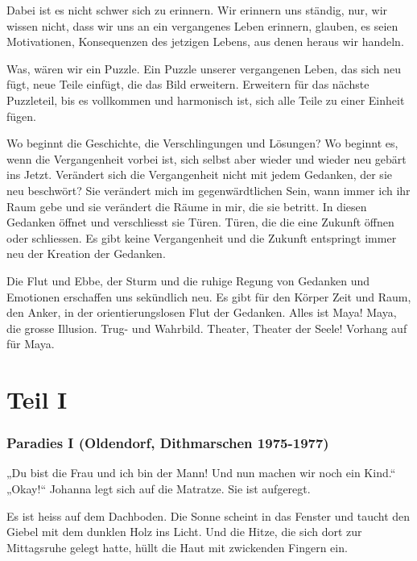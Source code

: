 \documentclass[10pt,a5paper]{book}
\begin{document}
Dabei ist es nicht schwer sich zu erinnern. Wir erinnern uns ständig, nur, wir wissen nicht, dass wir uns an ein vergangenes Leben erinnern, glauben, es seien Motivationen, Konsequenzen des jetzigen Lebens, aus denen heraus wir handeln.

Was, wären wir ein Puzzle. Ein Puzzle unserer vergangenen Leben, das sich neu fügt, neue Teile einfügt, die das Bild erweitern. Erweitern für das nächste Puzzleteil, bis es vollkommen und harmonisch ist, sich alle Teile zu einer Einheit fügen.

Wo beginnt die Geschichte, die Verschlingungen und Lösungen? Wo beginnt es, wenn die Vergangenheit vorbei ist, sich selbst aber wieder und wieder neu gebärt ins Jetzt. Verändert sich die Vergangenheit nicht mit jedem Gedanken, der sie neu beschwört? Sie verändert mich im gegenwärdtlichen Sein, wann immer ich ihr Raum gebe und sie verändert die Räume in mir, die sie betritt. In diesen Gedanken öffnet und verschliesst sie Türen. Türen, die die eine Zukunft öffnen oder schliessen. Es gibt keine Vergangenheit und die Zukunft entspringt immer neu der Kreation der Gedanken.

Die Flut und Ebbe, der Sturm und die ruhige Regung von Gedanken und Emotionen erschaffen uns sekündlich neu. Es gibt für den Körper Zeit und Raum, den Anker, in der orientierungslosen Flut der Gedanken. Alles ist Maya! Maya, die grosse Illusion. Trug- und Wahrbild. Theater, Theater der Seele!
Vorhang auf für Maya.



\part*{Teil I}


\section*{Paradies I (Oldendorf, Dithmarschen 1975-1977)}



„Du bist die Frau und ich bin der Mann! Und nun machen wir noch ein Kind.“ „Okay!“ Johanna legt sich auf die Matratze. Sie ist aufgeregt.

Es ist heiss auf dem Dachboden. Die Sonne scheint in das Fenster und taucht den Giebel mit dem dunklen Holz ins Licht. Und die Hitze, die sich dort zur Mittagsruhe gelegt hatte, hüllt die Haut mit zwickenden Fingern ein.
\end{document}
